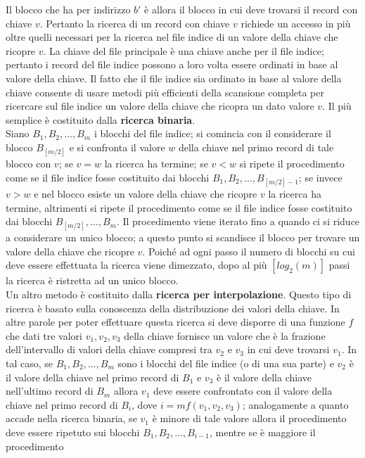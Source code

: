Il blocco che ha per indirizzo $b'$ è allora il blocco in cui deve trovarsi il record con chiave $v$.
Pertanto la ricerca di un record con chiave $v$ richiede un accesso in più oltre quelli necessari per la
ricerca nel file indice di un valore della chiave che ricopre $v$.
La chiave del file principale è una chiave anche per il file indice; pertanto i record del file indice
possono a loro volta essere ordinati in base al valore della chiave. Il fatto che il file indice sia
ordinato in base al valore della chiave consente di usare metodi più efficienti della scansione
completa per ricercare sul file indice un valore della chiave che ricopra un dato valore $v$.
Il più semplice è costituito dalla \textbf{ricerca binaria}.\\ Siano $B_1, B_2, \ldots, B_m$ i blocchi del file indice; si
comincia con il considerare il blocco $B_{[m/2]}$ e si confronta il valore $w$ della chiave nel primo record
di tale blocco con $v$; se $v = w$ la ricerca ha termine; se $v < w$ si ripete il procedimento come se il file
indice fosse costituito dai blocchi $B_1, B_2, \ldots, B_{[m/2]-1}$; se invece $v > w$ e nel blocco esiste un valore
della chiave che ricopre $v$ la ricerca ha termine, altrimenti si ripete il procedimento come se il file
indice fosse costituito dai blocchi $B_{[m/2]}, \ldots, B_m$. Il procedimento viene iterato fino a quando
ci si riduce a considerare un unico blocco; a questo punto si scandisce il blocco per trovare un
valore della chiave che ricopre $v$. Poiché ad ogni passo il numero di blocchi su cui deve essere
effettuata la ricerca viene dimezzato, dopo al più $[log_2(m)]$ passi la ricerca è ristretta ad un unico
blocco.\\
Un altro metodo è costituito dalla \textbf{ricerca per interpolazione}. Questo tipo di ricerca è basato sulla
conoscenza della distribuzione dei valori della chiave. In altre parole per poter effettuare questa
ricerca si deve disporre di una funzione $f$ che dati tre valori $v_1, v_2, v_3$ della chiave fornisce un valore
che è la frazione dell'intervallo di valori della chiave compresi tra $v_2$ e $v_3$ in cui deve trovarsi $v_1$. 
In tal caso, se $B_1, B_2, \ldots, B_m$ sono i blocchi del file indice (o di una sua parte) e $v_2$ è il valore della
chiave nel primo record di $B_1$ e $v_3$ è il valore della chiave nell'ultimo record di $B_m$ allora $v_1$ deve
essere confrontato con il valore della chiave nel primo record di $B_i$, dove $i = mf(v_1, v_2, v_3)$;
analogamente a quanto accade nella ricerca binaria, se $v_1$ è minore di tale valore allora il
procedimento deve essere ripetuto sui blocchi $B_1, B_2, \ldots, B_{i-1}$, mentre se è maggiore il procedimento
